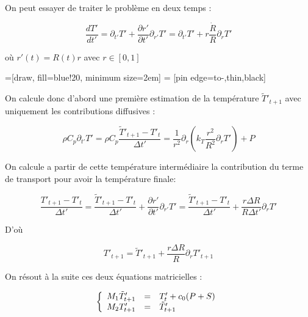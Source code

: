 \documentclass[10pt,a4paper]{article}
\numberwithin{equation}{section}
\begin{document}
On peut essayer de traiter le problème en deux temps : 

\begin{equation}
\frac{ dT'}{dt'} = \partial_{t'} T' + \frac{\partial r'}{\partial t'} \partial_{r'} T' = \partial_{t'} T' + r \frac{\dot{R}}{R}\partial_{r} T'
\end{equation}

où $r'(t) = R(t)r$ avec $r \in [0,1]$

=[draw, fill=blue!20, minimum size=2em]
 = [pin edge={to-,thin,black}]


On calcule donc d'abord une première estimation de la température $\tilde{T}'_{t+1}$ avec uniquement les contributions diffusives :

\begin{equation}
\rho C_p \partial_{t'} T'= \rho C_p \frac{\tilde{T}'_{t+1} - T'_{t}}{\Delta t'} = \frac{1}{r^2} \partial_{r} ( k_{T} \frac{r^2}{R^2} \partial_{r} T')  + P
\end{equation}

On calcule a partir de cette température intermédiaire la contribution du terme de transport pour avoir la température finale:

\begin{equation}
\frac{T'_{t+1} - T'_{t}}{\Delta t'} = \frac{\tilde{T}'_{t+1} - T'_{t}}{\Delta t'} + \frac{\partial r'}{\partial t'} \partial_{r'} T' =  \frac{\tilde{T}'_{t+1} - T'_{t}}{\Delta t'} + \frac{r\Delta R}{R\Delta t'}\partial_{r} T'
\end{equation}

D'où

\begin{equation}
T'_{t+1}  = \tilde{T}'_{t+1} + \frac{r\Delta R}{R}\partial_{r} T'_{t+1}
\end{equation}

On résout à la suite ces deux équations matricielles :

\begin{equation}
\left\{
\begin{array}{r c l}
M_1 \tilde{T}'_{t+1} &=& T'_t + c_0 ( P + S )\\
M_2 T'_{t+1}   &=& \tilde{T}'_{t+1}\\
\end{array}
\right.
\end{equation}

\newpage

 
\end{document}
